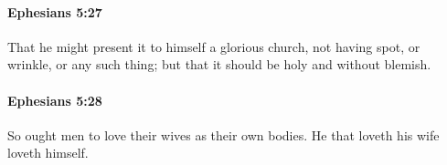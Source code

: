 		\paragraph{Ephesians 5:27} %
			\label{EPHESIANS-5-27}

			That he might present it to himself a glorious church, not having spot, or wrinkle, or any such thing; but that it should be holy and without blemish.

			\begin{framed}
			\scriptsize
				\begin{compactdesc}
					\item[SBLG] 
				\end{compactdesc}
			\end{framed}

		\paragraph{Ephesians 5:28} %
			\label{EPHESIANS-5-28}

			So ought men to love their wives as their own bodies.  He that loveth his wife loveth himself.

